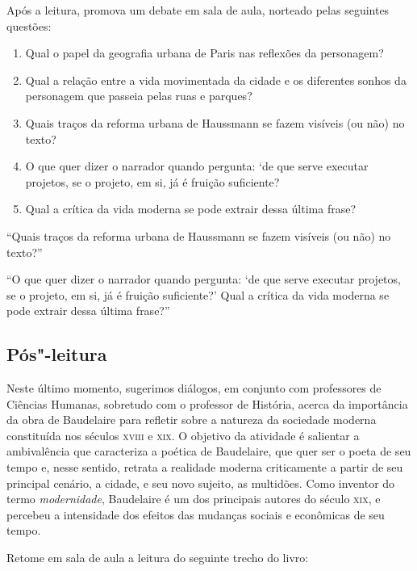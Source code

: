 \documentclass[12pt]{extarticle}
\begin{document}
Após a leitura, promova um debate em sala de aula, norteado pelas seguintes questões:

\begin{enumerate}
\item Qual o papel da geografia urbana de Paris nas reflexões da personagem?
\item Qual a relação entre a vida movimentada da cidade e os diferentes sonhos da personagem que passeia pelas ruas e parques?
\item Quais traços da reforma urbana de Haussmann se fazem visíveis (ou não) no texto?
\item O que quer dizer o narrador quando pergunta: `de que serve executar projetos, se o projeto, em si, já é fruição suficiente?
\item Qual a crítica da vida moderna se pode extrair dessa última frase?
\end{enumerate}




``Quais traços da reforma urbana de Haussmann se fazem visíveis (ou não) no texto?''

``O que quer dizer o narrador quando pergunta: `de que serve executar projetos, se o projeto, em si, já é fruição suficiente?' Qual a crítica da vida moderna se pode extrair dessa última frase?''

\subsection{Pós"-leitura}

Neste último momento, sugerimos diálogos, em conjunto com
professores de Ciências Humanas, sobretudo com o professor de História, acerca da importância da obra de Baudelaire para refletir sobre
a natureza da sociedade moderna constituída nos séculos \textsc{xviii} e \textsc{xix}. O objetivo da atividade é salientar a ambivalência que caracteriza a poética de Baudelaire, que quer ser o poeta de seu tempo e, nesse sentido, retrata a realidade moderna criticamente a partir de seu principal cenário, a cidade, e seu novo sujeito, as multidões. Como inventor do termo \textit{modernidade}, Baudelaire é um dos principais autores do século \textsc{xix}, e percebeu a intensidade dos efeitos das mudanças sociais e econômicas de seu tempo.

Retome em sala de aula a leitura do seguinte trecho do livro:
\end{document}
